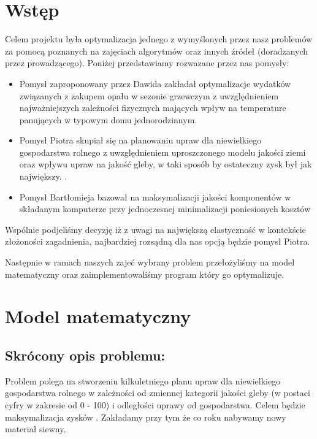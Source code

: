 \documentclass{article}
\begin{document}

\tableofcontents
\newpage
\section{Wstęp}
Celem projektu była optymalizacja jednego z wymyślonych przez nasz problemów za pomocą poznanych na zajęciach algorytmów oraz innych źródeł (doradzanych przez prowadzącego).
Poniżej przedstawiamy rozwazane przez nas pomysły:
\begin{itemize}
	\item Pomysł zaproponowany przez Dawida zakładał optymalizacje wydatków związanych z zakupem opału w sezonie grzewczym z uwzględnieniem najważniejszych zależności fizycznych mających wpływ na temperature panujących w typowym domu jednorodzinnym.
	\item Pomysł Piotra skupiał się na planowaniu upraw dla niewielkiego gospodarstwa rolnego z uwzględnieniem uproszczonego modelu jakości ziemi oraz wpływu upraw na jakość gleby, w taki sposób by ostateczny zysk był jak największy. .
	\item Pomysł Bartłomieja bazował na maksymalizacji jakości komponentów w składanym komputerze przy jednoczesnej minimalizacji poniesionych kosztów
\end{itemize}

Wspólnie podjeliśmy decyzję iż z uwagi na największą elastyczność w kontekście złożoności zagadnienia, najbardziej rozsądną dla nas opcją będzie pomysł Piotra.

Następnie w ramach naszych zajeć wybrany problem przełożyliśmy na model matematyczny oraz zaimplementowaliśmy program który go optymalizuje.

\section{Model matematyczny}

	\subsection{Skrócony opis problemu:}
	Problem polega na stworzeniu kilkuletniego planu upraw dla niewielkiego gospodarstwa rolnego w zależności od zmiennej kategorii jakości gleby (w postaci cyfry w zakresie od 0 - 100) i  odległości uprawy od gospodarstwa. Celem będzie maksymalizacja zysków . Zakładamy przy tym że co roku nabywamy nowy materiał siewny.
\end{document}
